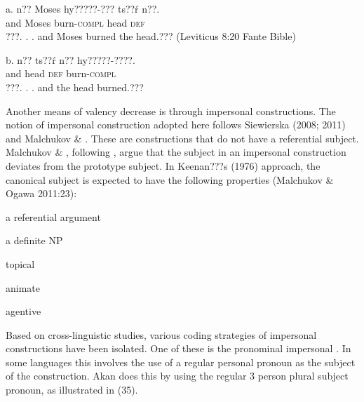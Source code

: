 \documentclass[output=paper]{langsci/langscibook}
\begin{document}
\ea
\gll a.  n??  Moses    hy?????-???   ts??\'{r}  n??.\\
       and   Moses     burn-\textsc{compl}  head  \textsc{def}\\
\glt ???. . .  and Moses burned the head.??? (Leviticus 8:20 Fante Bible)
\z

\ea
\gll  b.  n??  ts??\'{r}   n??  hy?????-????.\\
       and  head  \textsc{def}  burn-\textsc{compl}  \\
\glt ???. .  . and the head burned.???
\z


Another means of valency decrease is through impersonal constructions. The notion of impersonal construction adopted here follows Siewierska (2008; 2011) and Malchukov \& \citet{Ogawa2011}. These are constructions that do not have a referential subject. Malchukov \& \citet{Ogawa2011}, following \citet{Keenan1976}, argue that the subject in an impersonal construction deviates from the prototype subject. In Keenan???s (1976) approach, the canonical subject is expected to have the following properties (Malchukov \& Ogawa 2011:23):

\begin{styleNoSpacing}
a referential argument
\end{styleNoSpacing}

\begin{styleNoSpacing}
a definite NP
\end{styleNoSpacing}

\begin{styleNoSpacing}
topical
\end{styleNoSpacing}

\begin{styleNoSpacing}
animate
\end{styleNoSpacing}

\begin{styleNoSpacing}
agentive
\end{styleNoSpacing}

Based on cross-linguistic studies, various coding strategies of impersonal constructions have been isolated. One of these is the pronominal impersonal \citep{Siewierska2011}. In some languages this involves the use of a regular personal pronoun as the subject of the construction. Akan does this by using the regular 3 person plural subject pronoun, as illustrated in (35).
\end{document}
